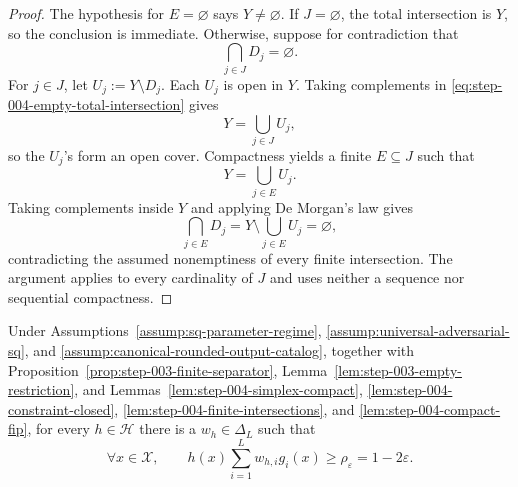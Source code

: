 \begin{proof}
The hypothesis for \(E=\varnothing\) says \(Y\ne\varnothing\).  If
\(J=\varnothing\), the total intersection is \(Y\), so the conclusion is
immediate.  Otherwise, suppose for contradiction that
\begin{equation}
\bigcap_{j\in J}D_j=\varnothing.
\label{eq:step-004-empty-total-intersection}
\end{equation}
For \(j\in J\), let \(U_j:=Y\setminus D_j\).  Each \(U_j\) is open in
\(Y\).  Taking complements in
\eqref{eq:step-004-empty-total-intersection} gives
\[
Y=\bigcup_{j\in J}U_j,
\]
so the \(U_j\)'s form an open cover.  Compactness yields a finite
\(E\subseteq J\) such that
\[
Y=\bigcup_{j\in E}U_j.
\]
Taking complements inside \(Y\) and applying De Morgan's law gives
\begin{equation}
\bigcap_{j\in E}D_j
=Y\setminus\bigcup_{j\in E}U_j
=\varnothing,
\label{eq:step-004-finite-contradiction}
\end{equation}
contradicting the assumed nonemptiness of every finite intersection.  The
argument applies to every cardinality of \(J\) and uses neither a sequence
nor sequential compactness.
\end{proof}

\begin{proposition}
\label{prop:step-004-global-separator}
Under Assumptions~\ref{assump:sq-parameter-regime},
\ref{assump:universal-adversarial-sq}, and
\ref{assump:canonical-rounded-output-catalog}, together with
Proposition~\ref{prop:step-003-finite-separator},
Lemma~\ref{lem:step-003-empty-restriction}, and
Lemmas~\ref{lem:step-004-simplex-compact},
\ref{lem:step-004-constraint-closed},
\ref{lem:step-004-finite-intersections}, and
\ref{lem:step-004-compact-fip}, for every \(h\in\mathcal H\) there is a
\(w_h\in\Delta_L\) such that
\begin{equation}
\forall x\in\mathcal X,
\qquad
h(x)\sum_{i=1}^Lw_{h,i}g_i(x)
\ge\rho_{\varepsilon}=1-2\varepsilon.
\label{eq:step-004-global-margin}
\end{equation}
\end{proposition}

